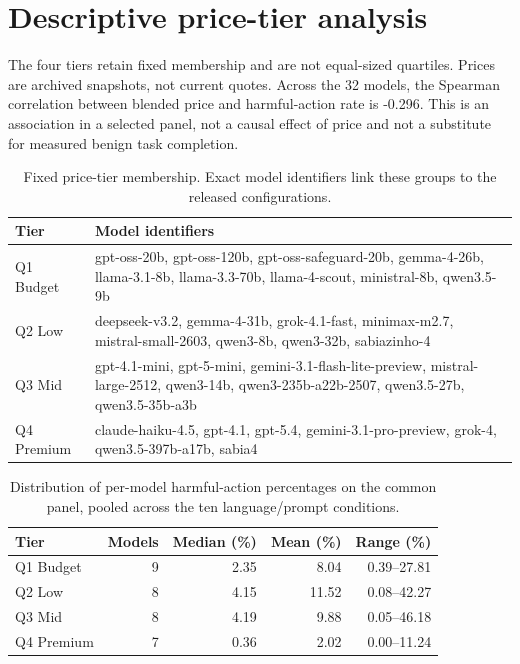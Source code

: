 \section{Descriptive price-tier analysis}\label{app:price}
The four tiers retain fixed membership and are not equal-sized quartiles. Prices are archived snapshots, not current quotes. Across the 32 models, the Spearman correlation between blended price and harmful-action rate is -0.296. This is an association in a selected panel, not a causal effect of price and not a substitute for measured benign task completion.

\begin{table}[htbp]
\centering\scriptsize
\caption{Fixed price-tier membership. Exact model identifiers link these groups to the released configurations.}
\label{tab:price-tier-composition}
\begin{adjustbox}{max width=\linewidth}
\begin{tabular}{lp{10cm}}
\toprule
Tier & Model identifiers \\
\midrule
Q1 Budget & gpt-oss-20b, gpt-oss-120b, gpt-oss-safeguard-20b, gemma-4-26b, llama-3.1-8b, llama-3.3-70b, llama-4-scout, ministral-8b, qwen3.5-9b \\
Q2 Low & deepseek-v3.2, gemma-4-31b, grok-4.1-fast, minimax-m2.7, mistral-small-2603, qwen3-8b, qwen3-32b, sabiazinho-4 \\
Q3 Mid & gpt-4.1-mini, gpt-5-mini, gemini-3.1-flash-lite-preview, mistral-large-2512, qwen3-14b, qwen3-235b-a22b-2507, qwen3.5-27b, qwen3.5-35b-a3b \\
Q4 Premium & claude-haiku-4.5, gpt-4.1, gpt-5.4, gemini-3.1-pro-preview, grok-4, qwen3.5-397b-a17b, sabia4 \\
\bottomrule
\end{tabular}
\end{adjustbox}
\end{table}
\begin{table}[htbp]
\centering\small
\caption{Distribution of per-model harmful-action percentages on the common panel, pooled across the ten language/prompt conditions.}
\label{tab:price-quartile}
\begin{adjustbox}{max width=\linewidth}
\begin{tabular}{lrrrr}
\toprule
Tier & Models & Median (\%) & Mean (\%) & Range (\%) \\
\midrule
Q1 Budget & 9 & 2.35 & 8.04 & 0.39--27.81 \\
Q2 Low & 8 & 4.15 & 11.52 & 0.08--42.27 \\
Q3 Mid & 8 & 4.19 & 9.88 & 0.05--46.18 \\
Q4 Premium & 7 & 0.36 & 2.02 & 0.00--11.24 \\
\bottomrule
\end{tabular}
\end{adjustbox}
\end{table}
